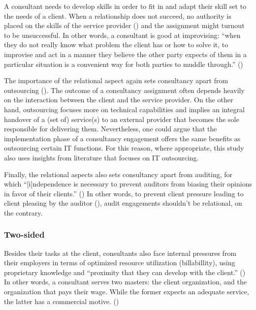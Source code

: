 \documentclass[
  man,floatsintext]{apa6}
\begin{document}
A consultant needs to develop skills in order to fit in and adapt their skill set to the needs of a client. When a relationship does not succeed, no authority is placed on the skills of the service provider () and the assignment might turnout to be unsuccessful. In other words, a consultant is good at improvising: ``when they do not really know what problem the client has or how to solve it, to improvise and act in a manner they believe the other party expects of them in a particular situation is a convenient way for both parties to muddle through.'' ()

The importance of the relational aspect again sets consultancy apart from outsourcing (). The outcome of a consultancy assignment often depends heavily on the interaction between the client and the service provider. On the other hand, outsourcing focuses more on technical capabilities and implies an integral handover of a (set of) service(s) to an external provider that becomes the sole responsible for delivering them. Nevertheless, one could argue that the implementation phase of a consultancy engagement offers the same benefits as outsourcing certain IT functions. For this reason, where appropriate, this study also uses insights from literature that focuses on IT outsourcing.

Finally, the relational aspects also sets consultancy apart from auditing, for which ``{[}i{]}ndependence is necessary to prevent auditors from biasing their opinions in favor of their clients.'' () In other words, to prevent client pressure leading to client pleasing by the auditor (), audit engagements shouldn't be relational, on the contrary.

\subsubsection{Two-sided}\label{two-sided}

Besides their tasks at the client, consultants also face internal pressures from their employers in terms of optimized resource utilization (billabillity), using proprietary knowledge and ``proximity that they can develop with the client.'' () In other words, a consultant serves two masters: the client organization, and the organization that pays their wage. While the former expects an adequate service, the latter has a commercial motive. ()
\end{document}
